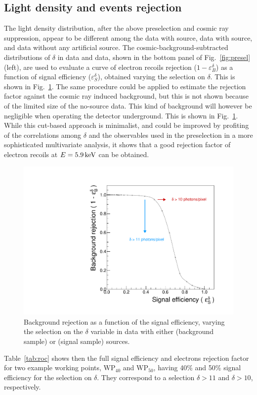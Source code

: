 \subsection{Light density and  \fe events rejection}
The light density distribution, after the above preselection and
cosmic ray suppression, appear to be different among the data
with \ambe source, data with \fe source, and data without any
artificial source.  The cosmic-background-subtracted distributions of
$\delta$ in \ambe data and \fe data, shown in the bottom panel of
Fig.~\ref{fig:presel} (left), are used to evaluate a curve of electron
recoils rejection ($1-\varepsilon^\delta_{B}$) as a function of signal
efficiency ($\varepsilon^\delta_{S}$), obtained varying the selection
on $\delta$. This is shown in Fig.~\ref{fig:roc}.  The same procedure
could be applied to estimate the rejection factor against the cosmic
ray induced background, but this is not shown because of the limited
size of the no-source data. This kind of background will however be
negligible when operating the detector underground. This is shown in
Fig.~\ref{fig:roc}. While this cut-based approach is minimalist, and
could be improved by profiting of the correlations among $\delta$ and
the observables used in the preselection in a more sophisticated
multivariate analysis, it shows that a good rejection factor of
electron recoils at $E=5.9\,\textrm{ke\hspace{-.08em}V}$ can be obtained.
%
\begin{figure}[ht]
  \begin{center}
  \includegraphics[width=0.45\linewidth]{figures/density_roc}

  \caption{Background rejection as a function of the signal
    efficiency, varying the selection on the $\delta$ variable in data
    with either \fe (background sample) or \ambe (signal sample)
    sources.  \label{fig:roc}}

  \end{center}
\end{figure}
%

 Table~\ref{tab:roc} shows then the
full signal efficiency and electrons rejection factor for two example
working points, $\mathrm{WP}_{40}$ and $\mathrm{WP}_{50}$, having 40\%
and 50\% signal efficiency for the selection on $\delta$. They
correspond to a selection $\delta>11$ and $\delta>10$, respectively.


